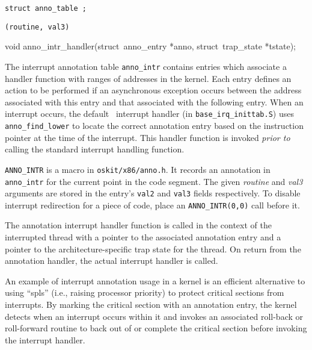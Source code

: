 \label{anno-intr}
\begin{apisyn}

	{\tt struct anno_table ;}

	{\tt {}(routine, val3)}

	\funcproto void anno_intr_handler(struct~anno_entry *anno,
		struct~trap_state *tstate);
\end{apisyn}
\begin{apidesc}
	The interrupt annotation table {\tt anno_intr} contains entries which
	associate a handler function with ranges of addresses in the kernel.
	Each entry defines an action to be performed if an asynchronous
	exception occurs between the address associated with this entry
	and that associated with the following entry.
	When an interrupt occurs,
	the default \oskit\ interrupt handler (in {\tt base_irq_inittab.S})
	uses {\tt anno_find_lower} to locate the correct annotation entry
	based on the instruction pointer at the time of the interrupt.
	This handler function is invoked \emph{prior to} calling the standard
	interrupt handling function.

	{\tt ANNO_INTR}
	is a macro in {\tt oskit/x86/anno.h}.
	It records an annotation in {\tt anno_intr}
	for the current point in the code segment.
	The given \emph{routine} and \emph{val3} arguments are stored in
	the entry's {\tt val2} and {\tt val3} fields respectively.
	To disable interrupt redirection for a piece of code,
	place an {\tt ANNO_INTR(0,0)} call before it.

	The annotation interrupt handler function is called in the context
	of the interrupted thread with a pointer to the associated annotation
	entry and a pointer to the architecture-specific trap state
	for the thread.
	On return from the annotation handler,
	the actual interrupt handler is called.

	An example of interrupt annotation usage in a kernel is an
	efficient alternative to using ``spls''
	(i.e., raising processor priority)
	to protect critical sections from interrupts.
	By marking the critical section with an annotation entry,
	the kernel detects when an interrupt occurs within it and invokes an
	associated roll-back or roll-forward routine to back out of or complete
	the critical section before invoking the interrupt handler.
\end{apidesc}

